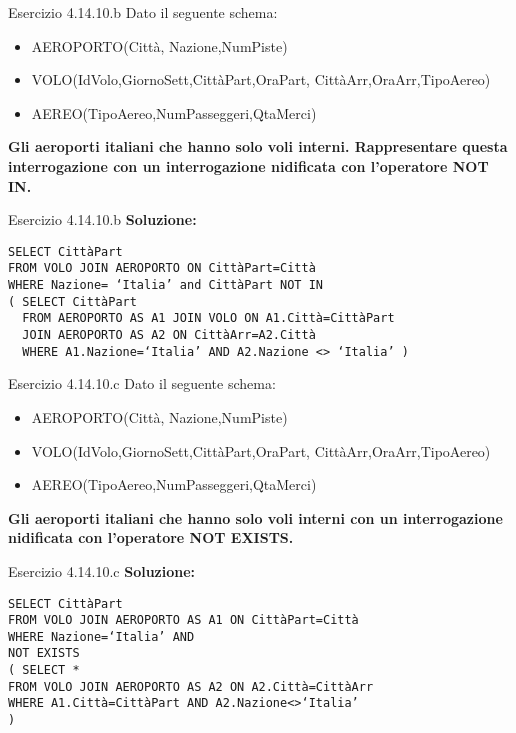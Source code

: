 \begin{frame}{Esercizio 4.14.10.b}
    Dato il seguente schema:
    \begin{itemize}
        \item AEROPORTO(Citt\`a, Nazione,NumPiste)
        \item VOLO(IdVolo,GiornoSett,Citt\`aPart,OraPart,
        Citt\`aArr,OraArr,TipoAereo)
        \item AEREO(TipoAereo,NumPasseggeri,QtaMerci)
    \end{itemize}
    \vspace{1em}
    
    \textbf{Gli aeroporti italiani che hanno solo voli interni. Rappresentare questa interrogazione con un interrogazione nidificata con l'operatore NOT IN.}
\end{frame}
\begin{frame}{Esercizio 4.14.10.b}
    \textbf{Soluzione:}
    \vspace{1em}
    
    \texttt{SELECT Citt\`aPart
    \\FROM VOLO JOIN AEROPORTO ON Citt\`aPart=Citt\`a
    \\WHERE Nazione= `Italia' and Citt\`aPart NOT IN
    \\( SELECT Citt\`aPart
    \\~~FROM AEROPORTO AS A1 JOIN VOLO ON A1.Citt\`a=Citt\`aPart \\~~JOIN AEROPORTO AS A2 ON Citt\`aArr=A2.Citt\`a
    \\~~WHERE  A1.Nazione=`Italia' AND A2.Nazione <> `Italia'  )}
\end{frame}
\begin{frame}{Esercizio 4.14.10.c}
    Dato il seguente schema:
    \begin{itemize}
        \item AEROPORTO(Citt\`a, Nazione,NumPiste)
        \item VOLO(IdVolo,GiornoSett,Citt\`aPart,OraPart,
        Citt\`aArr,OraArr,TipoAereo)
        \item AEREO(TipoAereo,NumPasseggeri,QtaMerci)
    \end{itemize}
    \vspace{1em}
    
    \textbf{Gli aeroporti italiani che hanno solo voli interni con un interrogazione nidificata con l'operatore NOT EXISTS.}
\end{frame}
\begin{frame}{Esercizio 4.14.10.c}
    \textbf{Soluzione:}
    \vspace{1em}
    
    \texttt{SELECT Citt\`aPart
    \\FROM VOLO JOIN AEROPORTO AS A1 ON Citt\`aPart=Citt\`a
    \\WHERE Nazione=`Italia' AND
    \\NOT EXISTS 
    \\( SELECT *
    \\FROM VOLO JOIN AEROPORTO AS A2 ON A2.Citt\`a=Citt\`aArr
    \\WHERE A1.Citt\`a=Citt\`aPart AND A2.Nazione<>`Italia'
    \\)}
\end{frame}
